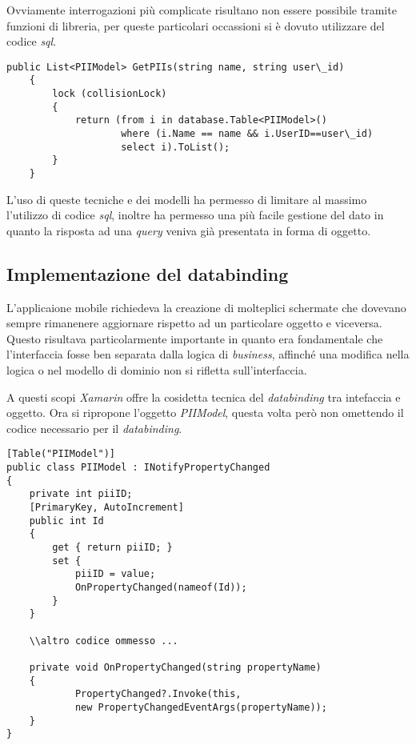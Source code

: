 Ovviamente interrogazioni più complicate risultano non essere possibile tramite funzioni di libreria, per queste particolari occassioni si è dovuto utilizzare del codice \emph{sql}.

\begin{lstlisting}[caption={Esempio di query sql}]
public List<PIIModel> GetPIIs(string name, string user\_id)
    {
        lock (collisionLock)
        {
            return (from i in database.Table<PIIModel>()
                    where (i.Name == name && i.UserID==user\_id)
                    select i).ToList();
        }
    }
\end{lstlisting}

L'uso di queste tecniche e dei modelli ha permesso di limitare al massimo l'utilizzo di codice \emph{sql}, inoltre ha permesso una più facile gestione del dato in quanto la risposta ad una \emph{query} veniva già presentata in forma di oggetto.

\subsection{Implementazione del databinding}
L'applicaione mobile richiedeva la creazione di molteplici schermate che dovevano sempre rimanenere aggiornare rispetto ad un particolare oggetto e viceversa. Questo risultava particolarmente importante in quanto era fondamentale che l’interfaccia fosse ben separata dalla logica di \emph{business}, affinché una modifica nella logica o nel modello di dominio non si rifletta sull’interfaccia. 

A questi scopi \emph{Xamarin} offre la cosidetta tecnica del \emph{databinding} tra intefaccia e oggetto. Ora si ripropone l'oggetto \emph{PIIModel}, questa volta però non omettendo il codice necessario per il \emph{databinding}.

\begin{lstlisting}[caption={esempio di oggetto in databinding}]
[Table("PIIModel")]
public class PIIModel : INotifyPropertyChanged
{
    private int piiID;
    [PrimaryKey, AutoIncrement]
    public int Id
    {
        get { return piiID; }
        set {
            piiID = value;
            OnPropertyChanged(nameof(Id));
        }
    }

    \\altro codice ommesso ...

    private void OnPropertyChanged(string propertyName)
    {
            PropertyChanged?.Invoke(this,
            new PropertyChangedEventArgs(propertyName));
    }
}
\end{lstlisting}

